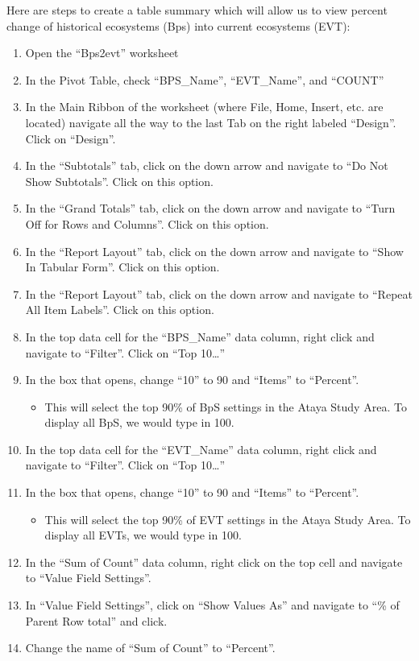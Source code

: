 \documentclass[
]{book}
\providecommand{\tightlist}{%
  \setlength{\itemsep}{0pt}\setlength{\parskip}{0pt}}
\begin{document}
Here are steps to create a table summary which will allow us to view percent change of historical ecosystems (Bps) into current ecosystems (EVT):

\begin{enumerate}
\def\labelenumi{\arabic{enumi}.}
\tightlist
\item
  Open the ``Bps2evt'' worksheet
\item
  In the Pivot Table, check ``BPS\_Name'', ``EVT\_Name'', and ``COUNT''
\item
  In the Main Ribbon of the worksheet (where File, Home, Insert, etc. are located) navigate all the way to the last Tab on the right labeled ``Design''. Click on ``Design''.
\item
  In the ``Subtotals'' tab, click on the down arrow and navigate to ``Do Not Show Subtotals''. Click on this option.
\item
  In the ``Grand Totals'' tab, click on the down arrow and navigate to ``Turn Off for Rows and Columns''. Click on this option.
\item
  In the ``Report Layout'' tab, click on the down arrow and navigate to ``Show In Tabular Form''. Click on this option.
\item
  In the ``Report Layout'' tab, click on the down arrow and navigate to ``Repeat All Item Labels''. Click on this option.
\item
  In the top data cell for the ``BPS\_Name'' data column, right click and navigate to ``Filter''. Click on ``Top 10\ldots{}''
\item
  In the box that opens, change ``10'' to 90 and ``Items'' to ``Percent''.

  \begin{itemize}
  \tightlist
  \item
    This will select the top 90\% of BpS settings in the Ataya Study Area. To display all BpS, we would type in 100.
  \end{itemize}
\item
  In the top data cell for the ``EVT\_Name'' data column, right click and navigate to ``Filter''. Click on ``Top 10\ldots{}''
\item
  In the box that opens, change ``10'' to 90 and ``Items'' to ``Percent''.

  \begin{itemize}
  \tightlist
  \item
    This will select the top 90\% of EVT settings in the Ataya Study Area. To display all EVTs, we would type in 100.
  \end{itemize}
\item
  In the ``Sum of Count'' data column, right click on the top cell and navigate to ``Value Field Settings''.
\item
  In ``Value Field Settings'', click on ``Show Values As'' and navigate to ``\% of Parent Row total'' and click.
\item
  Change the name of ``Sum of Count'' to ``Percent''.
\end{enumerate}
\end{document}
